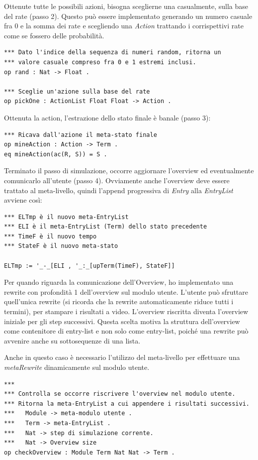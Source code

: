 Ottenute tutte le possibili azioni, bisogna sceglierne una casualmente, sulla
base del rate (passo 2). Questo può essere implementato generando un numero
casuale fra 0 e la somma dei rate e scegliendo una \emph{Action} trattando i
corrispettivi rate come se fossero delle probabilità.
\begin{Verbatim}[fontsize=\small]
*** Dato l'indice della sequenza di numeri random, ritorna un
*** valore casuale compreso fra 0 e 1 estremi inclusi.
op rand : Nat -> Float .

*** Sceglie un'azione sulla base del rate
op pickOne : ActionList Float Float -> Action .
\end{Verbatim}

Ottenuta la action, l'estrazione dello stato finale è banale (passo 3):
\begin{Verbatim}[fontsize=\small]
*** Ricava dall'azione il meta-stato finale
op mineAction : Action -> Term .
eq mineAction(ac(R, S)) = S .
\end{Verbatim}

Terminato il passo di simulazione, occorre aggiornare l'overview ed
eventualmente comunicarlo all'utente (passo 4). Ovviamente anche l'overview deve
essere trattato al meta-livello, quindi l'append progressiva di \emph{Entry}
alla \emph{EntryList} avviene così:
\begin{Verbatim}[fontsize=\small]
*** ELTmp è il nuovo meta-EntryList 
*** ELI è il meta-EntryList (Term) dello stato precedente 
*** TimeF è il nuovo tempo
*** StateF è il nuovo meta-stato

ELTmp := '_-_[ELI , '_:_[upTerm(TimeF), StateF]]
\end{Verbatim}

Per quando riguarda la comunicazione dell'Overview, ho implementato
una rewrite con profondità 1 dell'overview sul modulo utente. L'utente può
sfruttare quell'unica rewrite (si ricorda che la rewrite automaticamente riduce
tutti i termini), per stampare i risultati a video. L'overview riscritta diventa
l'overview iniziale per gli step successivi. Questa scelta motiva la struttura
dell'overview come contenitore di entry-list e non solo come entry-list, poiché
una rewrite può avvenire anche su sottosequenze di una lista.

Anche in questo caso è necessario l'utilizzo del meta-livello per effettuare una
\emph{metaRewrite} dinamicamente sul modulo utente.
\begin{Verbatim}[fontsize=\small]
***
*** Controlla se occorre riscrivere l'overview nel modulo utente.
*** Ritorna la meta-EntryList a cui appendere i risultati successivi. 
***   Module -> meta-modulo utente .
***   Term -> meta-EntryList .
***   Nat -> step di simulazione corrente.
***   Nat -> Overview size
op checkOverview : Module Term Nat Nat -> Term .
\end{Verbatim}


